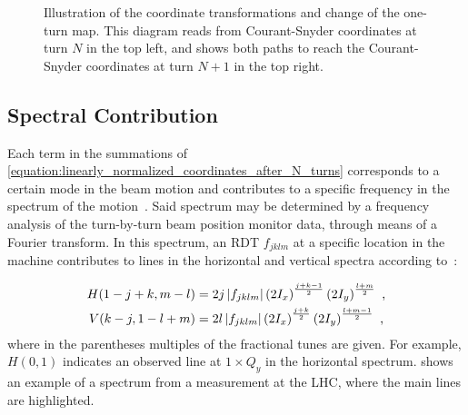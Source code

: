 \begin{figure}[!htb]
    \begin{center}
    \caption{Illustration of the coordinate transformations and change of the one-turn map. This diagram reads from Courant-Snyder coordinates at turn \(N\) in the top left, and shows both paths to reach the Courant-Snyder coordinates at turn \(N+1\) in the top right.}
    \label{figure:coordinate_transformations}
    \end{center}
\end{figure}

\subsection{Spectral Contribution}
\label{subsec:spectral_contribution}

Each term in the summations of \cref{equation:linearly_normalized_coordinates_after_N_turns} corresponds to a certain mode in the beam motion and contributes to a specific frequency in the spectrum of the motion~\cite{PHD:Bengtsson}.
Said spectrum may be determined by a frequency analysis of the turn-by-turn beam position monitor data, through means of a Fourier transform.
In this spectrum, an RDT \(f_{jklm}\) at a specific location in the machine contributes to lines in the horizontal and vertical spectra according to~\cite{PHD:Bengtsson,PRAB:Franchi:Emittance_Sharing_Coupling}:

\begin{equation}
    \begin{aligned}
        H(1-j+k, m-l) &= 2 j \left\lvert f_{jklm} \right\rvert \left( 2 I_x \right)^{\frac{j+k-1}{2}} \left( 2 I_y \right)^{\frac{l+m}{2}} \text{ ,}\\
        V(k-j, 1-l+m) &= 2 l \left\lvert f_{jklm} \right\rvert \left( 2 I_x \right)^{\frac{j+k}{2}} \left( 2 I_y \right)^{\frac{l+m-1}{2}} \text{ ,}
    \end{aligned}
    \label{equation:rdt_contribution_to_spectrum_line}
\end{equation}
where in the parentheses multiples of the fractional tunes are given.
For example, \(H(0,1)\) indicates an observed line at \(1 \times Q_y\) in the horizontal spectrum.
 shows an example of a spectrum from a measurement at the LHC, where the main lines are highlighted.

